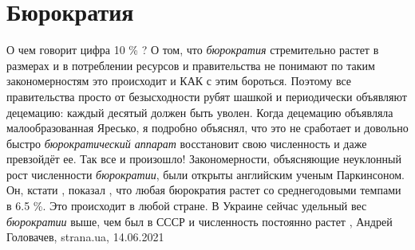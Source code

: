  
 
 
 
 
\chapter{Бюрократия}
\label{sec:slova.bjurokratia}

О чем говорит цифра 10 \% ?  О том, что \emph{бюрократия} стремительно растет в
размерах и в потреблении ресурсов и правительства не понимают по таким
закономерностям это происходит и КАК с этим бороться. Поэтому все правительства
просто от безысходности рубят шашкой и периодически объявляют децемацию: каждый
десятый должен быть уволен. Когда децемацию объявляла малообразованная Яресько,
я подробно объяснял, что это не сработает и довольно быстро
\emph{бюрократический аппарат} восстановит свою численность и даже превзойдёт
ее.  Так все и произошло!  Закономерности, объясняющие неуклонный рост
численности \emph{бюрократии}, были открыты английским ученым Паркинсоном. Он,
кстати , показал , что любая бюрократия растет со среднегодовыми темпами в 6.5
\%. Это происходит в любой стране. В Украине сейчас удельный вес
\emph{бюрократии} выше, чем был в СССР и численность постоянно растет
, 
Андрей Головачев, strana.ua, 14.06.2021

